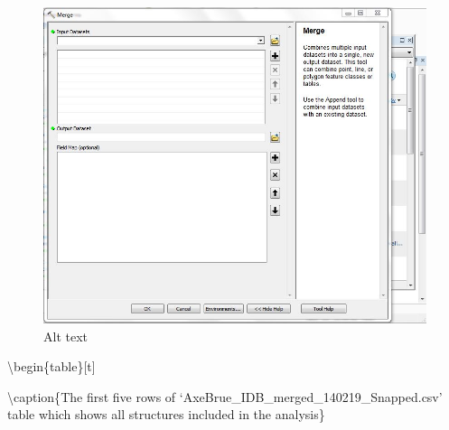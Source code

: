 \documentclass[]{article}
\begin{document}
\begin{figure}
\centering
\includegraphics{Capture_MergeTool.jpg}
\caption{Alt text}
\end{figure}

\textbackslash{}begin\{table\}{[}t{]}

\textbackslash{}caption\{\label{tab:unnamed-chunk-4}The first five rows
of `AxeBrue\_IDB\_merged\_140219\_Snapped.csv' table which shows all
structures included in the analysis\} \centering
\end{document}
